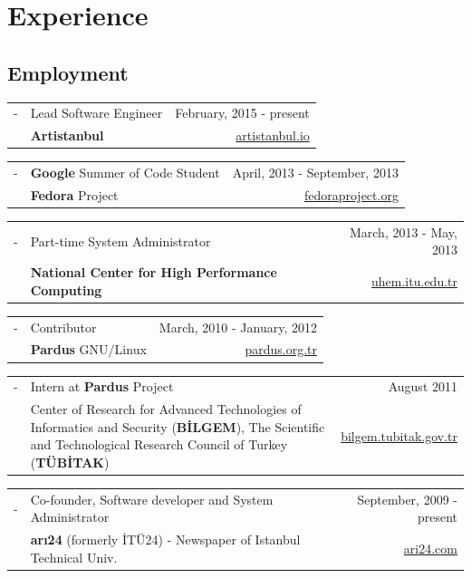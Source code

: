 \documentclass[11pt,a4paper]{article}
\renewenvironment{itemize}{
  \begin{list}{}{
    \setlength{\leftmargin}{0em}
  }
}{
  \end{list}
}
\begin{document}
\section*{Experience}
\subsection*{Employment}
\begin{itemize}
\item
\begin{tabularx}{\textwidth}{l X r}
- & Lead Software Engineer & February, 2015 - present\\
& \textbf{Artistanbul} & \href{https://www.artistanbul.io/}{artistanbul.io}
\end{tabularx}
\item
\begin{tabularx}{\textwidth}{l X r}
- & \textbf{Google} Summer of Code Student & April, 2013 - September, 2013\\
& \textbf{Fedora} Project & \href{http://fedoraproject.org/}{fedoraproject.org}
\end{tabularx}
\item
\begin{tabularx}{\textwidth}{l X r}
- & Part-time System Administrator & March, 2013 - May, 2013\\
& \textbf{National Center for High Performance Computing} & \href{http://www.uhem.itu.edu.tr/}{uhem.itu.edu.tr}
\end{tabularx}
\item
\begin{tabularx}{\textwidth}{l X r}
- & Contributor & March, 2010 - January, 2012\\
& \textbf{Pardus} GNU/Linux & \href{http://www.pardus.org.tr/}{pardus.org.tr}
\end{tabularx}
\item
\begin{tabularx}{\textwidth}{l X r}
- & Intern at \textbf{Pardus} Project & August 2011\\
& Center of Research for Advanced Technologies of Informatics and Security (\textbf{BİLGEM}), The Scientific and Technological Research Council of Turkey (\textbf{TÜBİTAK}) & \href{http://bilgem.tubitak.gov.tr}{bilgem.tubitak.gov.tr}
\end{tabularx}
\item
\begin{tabularx}{\textwidth}{l X r}
- & Co-founder, Software developer and System Administrator & September, 2009 - present\\
& \textbf{arı24} (formerly İTÜ24) - Newspaper of Istanbul Technical Univ. & \href{http://ari24.com}{ari24.com}
\end{tabularx}
\end{itemize}
\end{document}
